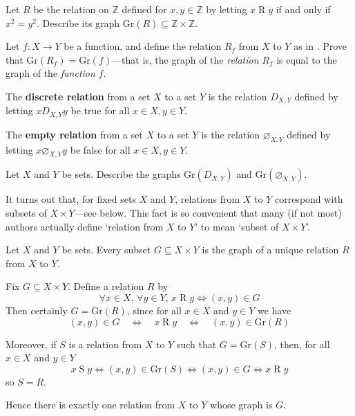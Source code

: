 \begin{exercise}
Let $R$ be the relation on $\mathbb{Z}$ defined for $x,y \in \mathbb{Z}$ by letting $x \mathrel{R} y$ if and only if $x^2=y^2$. Describe its graph $\mathrm{Gr}(R) \subseteq \mathbb{Z} \times \mathbb{Z}$.
\end{exercise}

\begin{exercise}
Let $f : X \to Y$ be a function, and define the relation $R_f$ from $X$ to $Y$ as in . Prove that $\mathrm{Gr}(R_f) = \mathrm{Gr}(f)$---that is, the graph of the \textit{relation} $R_f$ is equal to the graph of the \textit{function} $f$.
\end{exercise}

\begin{definition}
\label{defEmptyRelation}
\label{defDiscreteRelation}
The \textbf{discrete relation} from a set $X$ to a set $Y$ is the relation $D_{X,Y}$ defined by letting $x \mathrel{D_{X,Y}} y$ be true for all $x \in X, y \in Y$.

The \textbf{empty relation} from a set $X$ to a set $Y$ is the relation $\varnothing_{X,Y}$  defined by letting $x \mathrel{\varnothing_{X,Y}} y$ be false for all $x \in X, y \in Y$.
\end{definition}

\begin{exercise}
\label{exGraphOfEmptyAndDiscreteRelations}
Let $X$ and $Y$ be sets. Describe the graphs $\mathrm{Gr}(D_{X,Y})$ and $\mathrm{Gr}(\varnothing_{X,Y})$.
\end{exercise}

It turns out that, for fixed sets $X$ and $Y$, relations from $X$ to $Y$ correspond with subsets of $X \times Y$---see  below. This fact is so convenient that many (if not most) authors actually define `relation from $X$ to $Y$' to mean `subset of $X \times Y$'.

\begin{theorem}
\label{thmRelationsAsSubsets}
Let $X$ and $Y$ be sets. Every subset $G \subseteq X \times Y$ is the graph of a unique relation $R$ from $X$ to $Y$.
\end{theorem}
\begin{cproof}
Fix $G \subseteq X \times Y$. Define a relation $R$ by
\[ \forall x \in X,\, \forall y \in Y,\, x \mathbin{R} y \Leftrightarrow (x,y) \in G \]
Then certainly $G = \mathrm{Gr}(R)$, since for all $x \in X$ and $y \in Y$ we have
\[ (x,y) \in G \quad \Leftrightarrow \quad x \mathrel{R} y \quad \Leftrightarrow \quad (x,y) \in \mathrm{Gr}(R) \]

Moreover, if $S$ is a relation from $X$ to $Y$ such that $G=\mathrm{Gr}(S)$, then, for all $x \in X$ and $y \in Y$ 
\[ x \mathrel{S} y \Leftrightarrow (x,y) \in \mathrm{Gr}(S) \Leftrightarrow (x,y) \in G \Leftrightarrow x \mathrel{R} y \]
so $S=R$.

Hence there is exactly one relation from $X$ to $Y$ whose graph is $G$.
\end{cproof}

